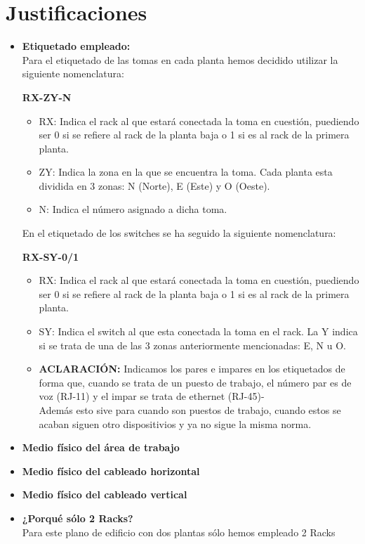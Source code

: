 \section{Justificaciones}
\begin{itemize}
    \item \textbf{Etiquetado empleado: }\\ Para el etiquetado de las tomas en cada planta hemos decidido utilizar la siguiente nomenclatura: \centerline{\textbf{RX-ZY-N}}
    \begin{itemize}
        \item RX: Indica el rack al que estará conectada la toma en cuestión, puediendo ser 0 si se refiere al rack de la planta baja o 1 si es al rack de la primera planta.
        \item ZY: Indica la zona en la que se encuentra la toma. Cada planta esta dividida en 3 zonas: N (Norte), E (Este) y O (Oeste).
        \item N: Indica el número asignado a dicha toma.
    \end{itemize}
    \vspace{0.5cm}
    En el etiquetado de los switches se ha seguido la siguiente nomenclatura: \centerline{\textbf{RX-SY-0/1}}
    \begin{itemize}
        \item RX: Indica el rack al que estará conectada la toma en cuestión, puediendo ser 0 si se refiere al rack de la planta baja o 1 si es al rack de la primera planta.
        \item SY: Indica el switch al que esta conectada la toma en el rack. La Y indica si se trata de una de las 3 zonas anteriormente mencionadas: E, N u O.
        \item \textbf{ACLARACIÓN:} Indicamos los pares e impares en los etiquetados de forma que, cuando se trata de un puesto de trabajo, el número par es de voz (RJ-11) y el impar se trata de ethernet (RJ-45)- \\ Además esto sive para cuando son puestos de trabajo, cuando estos se acaban siguen otro dispositivios y ya no sigue la misma norma.
    \end{itemize}
    \vspace{1cm}
    \item \textbf{Medio físico del área de trabajo}
    \vspace{1cm}
    \item \textbf{Medio físico del cableado horizontal}
    \vspace{1cm}
    \item \textbf{Medio físico del cableado vertical}
    \vspace{1cm}
    \item \textbf{¿Porqué sólo 2 Racks?}\\ Para este plano de edificio con dos plantas sólo hemos empleado 2 Racks
\end{itemize}
